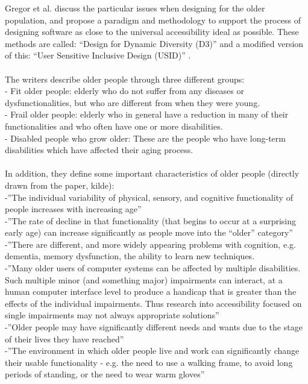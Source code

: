 Gregor et al. \cite{gregor} discuss the particular issues when designing for the older population, and propose a paradigm and methodology to support the process of designing software as close to the universal accessibility ideal as possible. These methods are called: “Design for Dynamic Diversity (D3)” and a modified version of this: “User Sensitive Inclusive Design (USID)” \cite{gregor}.\\ \\
The writers describe older people through three different groups: \\
- Fit older people: elderly who do not suffer from any diseases or dysfunctionalities, but who are different from when they were young.\\
- Frail older people: elderly who in  general have a reduction in many of their functionalities and who often have one or more disabilities.\\
- Disabled people who grow older: These are the people who have long-term disabilities which have affected their aging process. \\ \\
In addition, they define some important characteristics of older people (directly drawn from the paper, kilde):\\
-”The individual variability of physical, sensory, and cognitive functionality of people increases with increasing age”\\
-”The rate of decline in that functionality (that begins to occur at a surprising early age) can increase significantly as people move into the “older” category”\\
-”There are different, and more widely appearing problems with cognition, e.g. dementia, memory dysfunction, the ability to learn new techniques.\\
-”Many older users of computer systems can be affected by multiple disabilities. Such multiple minor (and something major) impairments can interact, at a human computer interface level to produce a handicap that is greater than the effects of the individual impairments. Thus research into accessibility focused on single impairments may not always appropriate solutions”\\
-”Older people may have significantly different needs and wants due to the stage of their lives they have reached”\\
-”The environment in which older people live and work can significantly change their usable functionality - e.g. the need to use a walking frame, to avoid long periods of standing, or the need to wear warm gloves”\\
